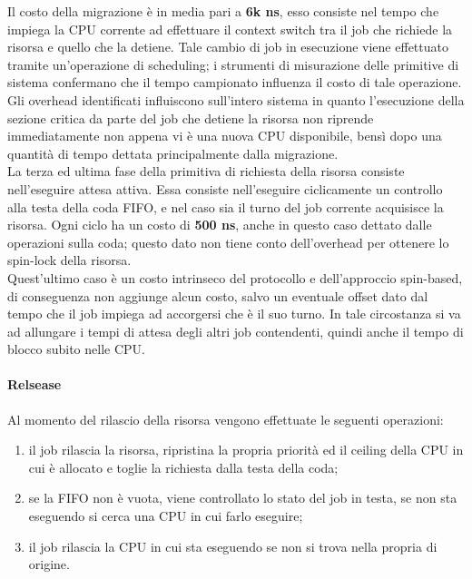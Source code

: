 {\noindent Il costo della migrazione è in media pari a \textbf{6k ns}, esso consiste nel tempo che impiega la CPU corrente ad effettuare il context switch tra il job che richiede la risorsa e quello che la detiene. Tale cambio di job in esecuzione viene effettuato tramite un'operazione di scheduling; i strumenti di misurazione delle primitive di sistema confermano che il tempo campionato influenza il costo di tale operazione.\\

\noindent Gli overhead identificati influiscono sull'intero sistema in quanto l'esecuzione della sezione critica da parte del job che detiene la risorsa non riprende immediatamente non appena vi è una nuova CPU disponibile, bensì dopo una quantità di tempo dettata principalmente dalla migrazione.\\

\noindent La terza ed ultima fase della primitiva di richiesta della risorsa consiste nell'eseguire attesa attiva. Essa consiste nell'eseguire ciclicamente un controllo alla testa della coda FIFO, e nel caso sia il turno del job corrente acquisisce la risorsa. Ogni ciclo ha un costo di \textbf{500 ns}, anche in questo caso dettato dalle operazioni sulla coda; questo dato non tiene conto dell'overhead per ottenere lo spin-lock della risorsa.\\

\noindent Quest'ultimo caso è un costo intrinseco del protocollo e dell'approccio spin-based, di conseguenza non aggiunge alcun costo, salvo un eventuale offset dato dal tempo che il job impiega ad accorgersi che è il suo turno. In tale circostanza si va ad allungare i tempi di attesa degli altri job contendenti, quindi anche il tempo di blocco subito nelle CPU.\\

\paragraph{Relsease} Al momento del rilascio della risorsa vengono effettuate le seguenti operazioni:

\begin{enumerate}
	\item il job rilascia la risorsa, ripristina la propria priorità ed il ceiling della CPU in cui è allocato e toglie la richiesta dalla testa della coda;
	\item se la FIFO non è vuota, viene controllato lo stato del job in testa, se non sta eseguendo si cerca una CPU in cui farlo eseguire;
	\item il job rilascia la CPU in cui sta eseguendo se non si trova nella propria di origine.
\end{enumerate}

}
